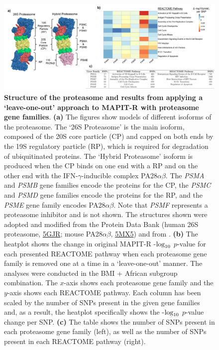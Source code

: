 \documentclass[12pt,a4paper]{article}
\def\log{{\rm log}}
\begin{document}
\begin{figure}[htbp]
\centering
\hspace*{-2.5cm}
\includegraphics[scale=.55]{Images/Main/InterPath_Main_Figure_Proteasome_vs2.png}
\caption[TBD]{\textbf{Structure of the proteasome and results from applying a `leave-one-out' approach to MAPIT-R with proteasome gene families}. \textbf{(a)} The figures show models of different isoforms of the proteasome. The `26S Proteasome' is the main isoform, composed of the 20S core particle (CP) and capped on both ends by  the 19S regulatory particle (RP), which is required for degradation of ubiquitinated proteins. The `Hybrid Proteasome' isoform is produced when the CP binds on one end with a RP and on the other end with the IFN-$\gamma$-inducible complex PA28$\alpha\beta$. The \textit{PSMA} and \textit{PSMB} gene families encode the proteins for the CP, the \textit{PSMC} and \textit{PSMD} gene families encode the proteins for the RP, and the \textit{PSME} gene family encodes PA28$\alpha\beta$. Note that \textit{PSMF} represents a proteasome inhibitor and is not shown. The structures shown were adopted and modified from the Protein Data Bank (human 26S proteasome, \href{https://www.rcsb.org/structure/5GJR}{5GJR}; mouse PA28$\alpha\beta$, \href{https://www.rcsb.org/structure/5MX5}{5MX5}) and from \citet{Murata2018}. \textbf{(b)} The heatplot shows the change in original MAPIT-R -$\log_{10}$ $p$-value for each presented REACTOME pathway when each proteasome gene family is removed one at a time in a `leave-one-out' manner. The analyses were conducted in the BMI + African subgroup combination. The $x$-axis shows each proteasome gene family and the $y$-axis shows each REACTOME pathway. Each column has been scaled by the number of SNPs present in the given gene families and, as a result, the heatplot specifically shows the -$\log_{10}$ $p$-value change per SNP. \textbf{(c)} The table shows the number of SNPs present in each proteasome gene family (left), as well as the number of SNPs present in each REACTOME pathway (right).}
\label{InterPath-Main-Figure-Proteasome-Panels}
\end{figure}
\end{document}
